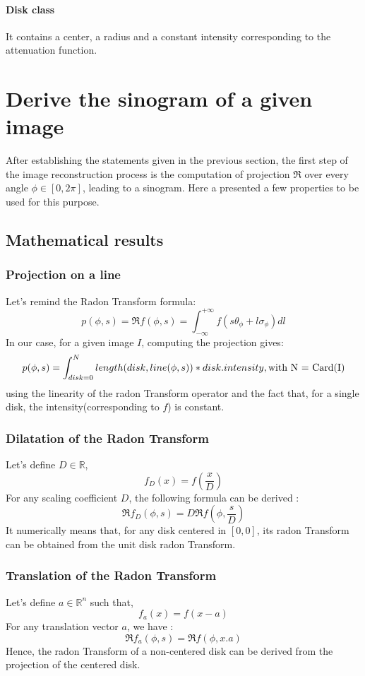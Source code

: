 \documentclass[a4,12pt]{article}
\begin{document}
\paragraph{Disk class}
It contains a center, a radius and a constant intensity corresponding to the attenuation function. 

\section{Derive the sinogram of a given image}
After establishing the statements given in the previous section, the first step of the image reconstruction process is the computation of projection $\Re$ over every angle $\phi \in [0,2\pi]$, leading to a sinogram. Here a presented a few properties to be used for this purpose.

\subsection{Mathematical results}
\subsubsection{Projection on a line}
Let's remind the Radon Transform formula:
\[
p(\phi,s) = \Re f(\phi,s) = \int_{-\infty}^{+\infty}f(s\theta_{\phi} + l\sigma_{\phi})dl
\]
In our case, for a given image $I$, computing the projection gives:
\[
p(\phi,s) = \int_{disk = 0}^{N}length(disk,line(\phi,s))*disk.intensity, \text{with N = Card(I) \\}
\] 
using the linearity of the radon Transform operator and the fact that, for a single disk, the intensity(corresponding to $f$) is constant.

\subsubsection{Dilatation of the Radon Transform}
Let's define $D \in \mathbb{R}$,
\[
	f_{D}(x) = f(\frac{x}{D})
\]
For any scaling coefficient $D$, the following formula can be derived : 
\[
\Re f_{D}(\phi,s) = D\Re f(\phi,\frac{s}{D})
\]
It numerically means that, for any disk centered in $[0,0]$, its radon Transform can be obtained from the unit disk radon Transform.

\subsubsection{Translation of the Radon Transform}
Let's define $a \in \mathbb{R}^{n}$ such that, 
\[
	f_{a}(x) = f(x-a)
\]
For any translation vector $a$, we have :
\[
\Re f_{a}(\phi,s) = \Re f(\phi,x.a)
\]
Hence, the radon Transform of a non-centered disk can be derived from the projection of the centered disk. \\ \\
\end{document}
